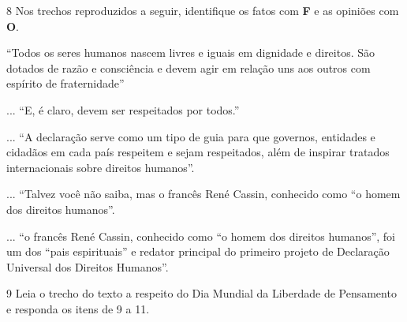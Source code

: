 
\num{8} Nos trechos reproduzidos a seguir, identifique os fatos com \textbf{F}
e as opiniões com \textbf{O}.


\begin{boxlist}
 ``Todos os seres humanos nascem livres e iguais em
dignidade e direitos. São dotados de razão e consciência e devem agir 
em relação uns aos outros com espírito de fraternidade''

 ... ``E, é claro, devem ser respeitados por todos.''

 ... ``A declaração serve como um tipo de guia para que
governos, entidades e cidadãos em cada país respeitem e sejam respeitados,
além de inspirar tratados internacionais sobre direitos humanos''.

 ... ``Talvez você não saiba, mas o francês René Cassin,
conhecido como ``o homem dos direitos humanos''.

 ... ``o francês René Cassin, conhecido como ``o homem 
dos direitos humanos'', foi um dos ``pais espirituais'' e redator principal do
primeiro projeto de Declaração Universal dos Direitos Humanos''.
\end{boxlist}

\num{9} Leia o trecho do texto a respeito do Dia Mundial da Liberdade de
Pensamento e responda os itens de 9 a 11.

